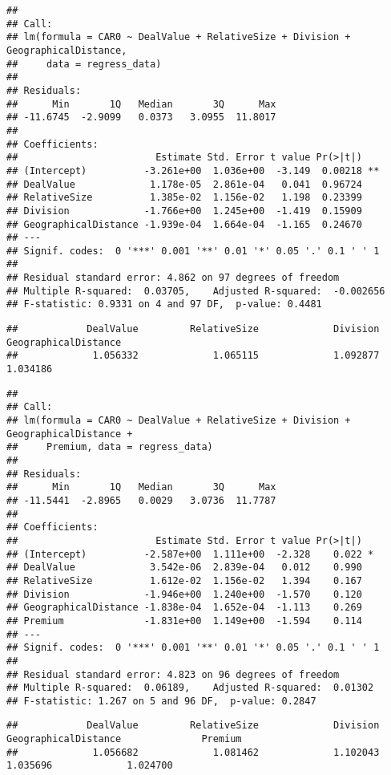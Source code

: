 \documentclass[]{article}
\begin{document}
\begin{verbatim}
## 
## Call:
## lm(formula = CAR0 ~ DealValue + RelativeSize + Division + GeographicalDistance, 
##     data = regress_data)
## 
## Residuals:
##      Min       1Q   Median       3Q      Max 
## -11.6745  -2.9099   0.0373   3.0955  11.8017 
## 
## Coefficients:
##                        Estimate Std. Error t value Pr(>|t|)   
## (Intercept)          -3.261e+00  1.036e+00  -3.149  0.00218 **
## DealValue             1.178e-05  2.861e-04   0.041  0.96724   
## RelativeSize          1.385e-02  1.156e-02   1.198  0.23399   
## Division             -1.766e+00  1.245e+00  -1.419  0.15909   
## GeographicalDistance -1.939e-04  1.664e-04  -1.165  0.24670   
## ---
## Signif. codes:  0 '***' 0.001 '**' 0.01 '*' 0.05 '.' 0.1 ' ' 1
## 
## Residual standard error: 4.862 on 97 degrees of freedom
## Multiple R-squared:  0.03705,    Adjusted R-squared:  -0.002656 
## F-statistic: 0.9331 on 4 and 97 DF,  p-value: 0.4481
\end{verbatim}

\begin{verbatim}
##            DealValue         RelativeSize             Division GeographicalDistance 
##             1.056332             1.065115             1.092877             1.034186
\end{verbatim}

\begin{verbatim}
## 
## Call:
## lm(formula = CAR0 ~ DealValue + RelativeSize + Division + GeographicalDistance + 
##     Premium, data = regress_data)
## 
## Residuals:
##      Min       1Q   Median       3Q      Max 
## -11.5441  -2.8965   0.0029   3.0736  11.7787 
## 
## Coefficients:
##                        Estimate Std. Error t value Pr(>|t|)  
## (Intercept)          -2.587e+00  1.111e+00  -2.328    0.022 *
## DealValue             3.542e-06  2.839e-04   0.012    0.990  
## RelativeSize          1.612e-02  1.156e-02   1.394    0.167  
## Division             -1.946e+00  1.240e+00  -1.570    0.120  
## GeographicalDistance -1.838e-04  1.652e-04  -1.113    0.269  
## Premium              -1.831e+00  1.149e+00  -1.594    0.114  
## ---
## Signif. codes:  0 '***' 0.001 '**' 0.01 '*' 0.05 '.' 0.1 ' ' 1
## 
## Residual standard error: 4.823 on 96 degrees of freedom
## Multiple R-squared:  0.06189,    Adjusted R-squared:  0.01302 
## F-statistic: 1.267 on 5 and 96 DF,  p-value: 0.2847
\end{verbatim}

\begin{verbatim}
##            DealValue         RelativeSize             Division GeographicalDistance              Premium 
##             1.056682             1.081462             1.102043             1.035696             1.024700
\end{verbatim}
\end{document}
